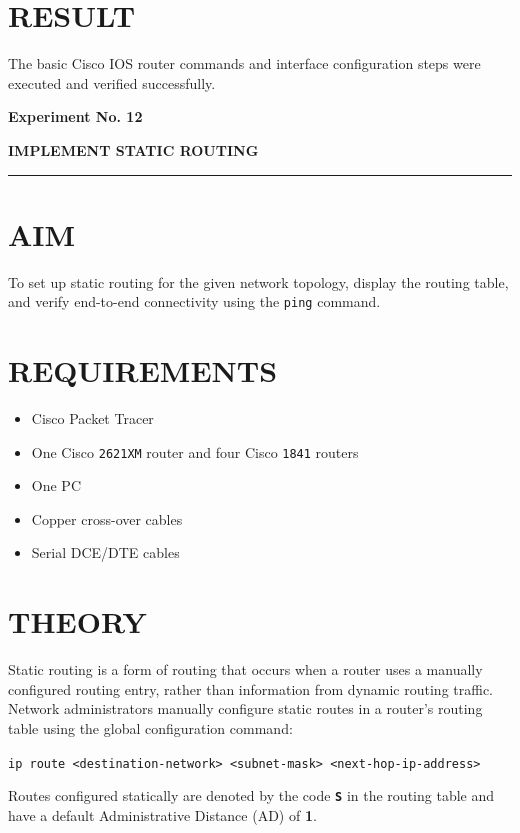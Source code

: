 \documentclass[12pt,a4paper]{article}
\newcommand{\experiment}[2]{
	\newpage
	
	\begin{center}
		\noindent
		\begin{minipage}{\textwidth}
			\centering
			{\textbf{\Large Experiment No. #1}}
			
			\vspace{1cm}
			
			\textbf{\Large #2}
		\end{minipage}
		
		\vspace{0.3cm}
		\noindent\rule{\textwidth}{0.6pt}
	\end{center}
}
\begin{document}
\section*{RESULT}
The basic Cisco IOS router commands and interface configuration steps were executed and verified successfully.
	
	
	


\experiment{12}{IMPLEMENT STATIC ROUTING}

\section*{AIM}
To set up static routing for the given network topology, display the routing table, and verify end-to-end connectivity using the \texttt{ping} command.

\section*{REQUIREMENTS}
\begin{itemize}
	\item Cisco Packet Tracer
	\item One Cisco \texttt{2621XM} router and four Cisco \texttt{1841} routers
	\item One PC 
	\item Copper cross-over cables
	\item Serial DCE/DTE cables
\end{itemize}

\section*{THEORY}
Static routing is a form of routing that occurs when a router uses a manually configured routing entry, rather than information from dynamic routing traffic. Network administrators manually configure static routes in a router's routing table using the global configuration command:
\begin{center}
	\texttt{ip route <destination-network> <subnet-mask> <next-hop-ip-address>}
\end{center}
Routes configured statically are denoted by the code \textbf{\texttt{S}} in the routing table and have a default Administrative Distance (AD) of \textbf{1}.
\end{document}
